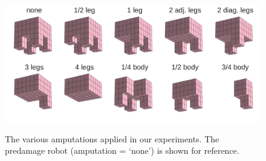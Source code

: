 \begin{figure}[h]
\begin{center}
\includegraphics[trim={14pt 0 14pt 0},clip,width=0.9\linewidth]{Chapter05/fig/damage_scenarios.png}\\
\caption{\label{fig5:scenarios}The various amputations applied in our experiments. 
The predamage robot (amputation = `none') is shown for reference.}
\vspace{-13pt}
\end{center}
\end{figure}